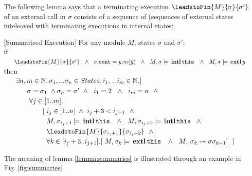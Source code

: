  The following lemma says that a terminating execution $\leadstoFin {M} {\sigma} {\sigma'}$ of an external call in $\sigma$ consists of a sequence of (sequences of external states inteleaved with terminating executions in internal states:
 
\begin{lemma}
\label{lemma:external_breakdown}[Summarised Execution]
For any module $M$,  states $\sigma$ and $\sigma'$:
\\
if \\
$\strut \ \ \ \ \ \leadstoFin {M} {\sigma} {\sigma'}  \ \ \wedge\ \ \sigma.\texttt{cont} = y.m(\overline y) \ \ \wedge  \ \ M,\sigma \models \internal {\texttt{this}}\ \ \wedge \ \ M,\sigma \models \external y\ $
\\
then
\\
$\strut \ \ \ \ \ \exists n,m\in \mathbb{N}, \sigma_1, ... \sigma_n \in States, i_1,...i_m \in \mathbb{N}. [$\\
$\strut \ \ \ \ \ \ \ \ \ \ \sigma=\sigma_1  \ \wedge  \sigma_n=\sigma'\ \wedge\ \  i_1=2 \ \ \wedge\ \   i_m=n\ \ \wedge$\\
$\strut \ \ \ \ \ \ \ \ \ \ \ \forall j\in [1..m].$\\
$\strut \ \ \ \ \ \ \ \ \ \ \hspace{.8cm}[ \ i_j \in [1..n]\  \wedge \ i_{j}+3  < i_{j+1} \ \ \wedge$\\
$\strut \ \ \ \ \ \ \ \ \ \ \hspace{1cm} M, \sigma_{i_j+1} \models \internal {\texttt{this}}  \ \ \wedge \ \ M, \sigma_{i_j+2} \models \internal {\texttt{this}}  \ \ \wedge$\\
$\strut \ \ \ \ \ \ \ \ \ \ \hspace{1cm}  \leadstoFin {M} {\sigma_{i_j+1}} {\sigma_{i_j+2}}\ \ \wedge $\\
$\strut \ \ \ \ \ \ \ \ \ \ \hspace{1cm} \forall k\in [i_j+3..i_{j+1}]. [\ M, \sigma_k \models {\ensuremath{\, \mathbf{extl}}\, \texttt{this}\, }  \ \ \wedge \ \ M;\, {\sigma_{k}} \rightsquigarrow \sigma{\sigma_{k+1}}] \ \ ]$
\end{lemma}

The meaning of lemma \ref{lemma:summaries} is illustrated through an example in Fig. \ref{fig:summaries}.

